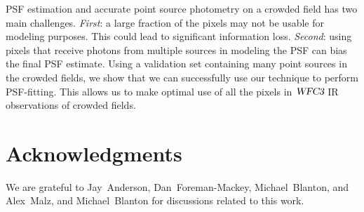 PSF estimation and accurate point source photometry on a crowded field has two main challenges. \emph{First}: a large fraction of the pixels may not be usable for modeling purposes. This could lead to  significant information loss. \emph{Second}: using pixels that receive photons from multiple sources in modeling the PSF can bias the final PSF estimate. 
Using a validation set containing many point sources in the crowded fields, we show that we can successfully use our technique to perform PSF-fitting. 
This allows us to make optimal use of all the pixels in ${\textsl{WFC3}}$ IR observations of crowded fields.

\section*{Acknowledgments}

We are grateful to Jay~Anderson, Dan~Foreman-Mackey, Michael~Blanton, and Alex~Malz, and Michael~Blanton for discussions related to this work.



